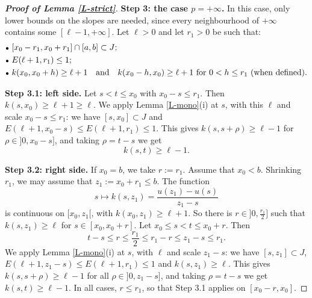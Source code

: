 \documentclass[reqno,12pt]{amsart}
\numberwithin{equation}{section}
\theoremstyle{remark}
\begin{document}
\begin{proof}[\bf Proof of Lemma \ref{L-strict}]
\bigskip

{\bf Step 3: the case \boldmath$p=+\infty$\unboldmath.} In this case, only lower bounds on the slopes are needed, since every neighbourhood of $+\infty$ contains some $[\ell-1,+\infty]$. Let $\ell>0$ and let $r_1>0$ be such that:
\begin{align*}
&{\scriptstyle\bullet}\ [x_0-r_1,x_0+r_1]\cap[a,b]\subset J;\\
&{\scriptstyle\bullet}\ E(\ell+1,r_1)\leq1;\\
&{\scriptstyle\bullet}\ k(x_0,x_0+h)\geq\ell+1\quad\hbox{and}\quad k(x_0-h,x_0)\geq\ell+1\hbox{ for }0<h\leq r_1\hbox{ (when defined)}.
\end{align*}

\medskip

{\bf Step 3.1: left side.} Let $s<t\leq x_0$ with $x_0-s\leq r_1$. Then $k(s,x_0)\geq\ell+1\geq\ell$. We apply Lemma \ref{L-mono}(i) at $s$, with this $\ell$ and scale $x_0-s\leq r_1$: we have $[s,x_0]\subset J$ and $E(\ell+1,x_0-s)\leq E(\ell+1,r_1)\leq1$. This gives $k(s,s+\rho)\geq\ell-1$ for $\rho\in]0,x_0-s]$, and taking $\rho=t-s$ we get
\begin{equation*}
k(s,t)\geq\ell-1.
\end{equation*}

\medskip

{\bf Step 3.2: right side.} If $x_0=b$, we take $r:=r_1$. Assume that $x_0<b$. Shrinking $r_1$, we may assume that $z_1:=x_0+r_1\leq b$. The function
\begin{equation*}
s\longmapsto k(s,z_1)=\frac{u(z_1)-u(s)}{z_1-s}
\end{equation*}
is continuous on $[x_0,z_1[$, with $k(x_0,z_1)\geq\ell+1$. So there is $r\in]0,\frac{r_1}2]$ such that $k(s,z_1)\geq\ell$ for $s\in[x_0,x_0+r]$. Let $x_0\leq s<t\leq x_0+r$. Then
\begin{equation*}
t-s\leq r\leq\frac{r_1}2\leq r_1-r\leq z_1-s\leq r_1.
\end{equation*}
We apply Lemma \ref{L-mono}(i) at $s$, with $\ell$ and scale $z_1-s$: we have $[s,z_1]\subset J$, $E(\ell+1,z_1-s)\leq E(\ell+1,r_1)\leq1$ and $k(s,z_1)\geq\ell$. This gives $k(s,s+\rho)\geq\ell-1$ for all $\rho\in]0,z_1-s]$, and taking $\rho=t-s$ we get $k(s,t)\geq\ell-1$. In all cases, $r\leq r_1$, so that Step 3.1 applies on $[x_0-r,x_0]$.

\bigskip


\end{proof}
\end{document}
